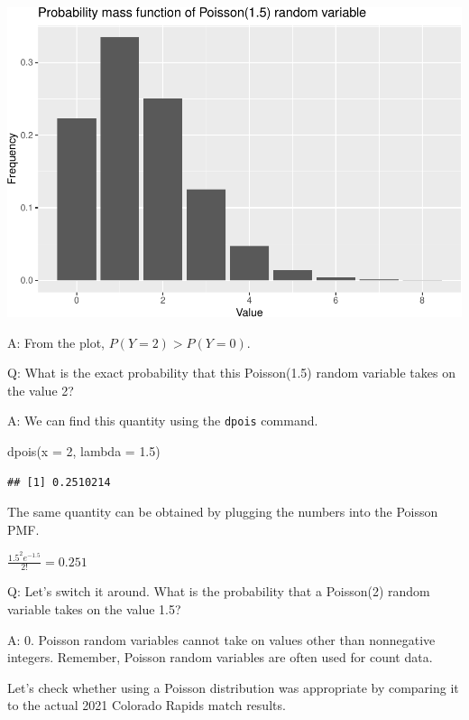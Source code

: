 \documentclass[
  11pt,
]{book}
\newenvironment{Shaded}{\begin{snugshade}}{\end{snugshade}}
\newcommand{\AttributeTok}[1]{\textcolor[rgb]{0.77,0.63,0.00}{#1}}
\newcommand{\DecValTok}[1]{\textcolor[rgb]{0.00,0.00,0.81}{#1}}
\newcommand{\FloatTok}[1]{\textcolor[rgb]{0.00,0.00,0.81}{#1}}
\newcommand{\FunctionTok}[1]{\textcolor[rgb]{0.00,0.00,0.00}{#1}}
\newcommand{\NormalTok}[1]{#1}
\theoremstyle{definition}
\theoremstyle{definition}
\theoremstyle{definition}
\theoremstyle{definition}
\theoremstyle{remark}
\begin{document}
\includegraphics{series_files/figure-latex/soccer poisson-1.pdf}

A: From the plot, \(P(Y = 2) > P(Y = 0)\).

Q: What is the exact probability that this Poisson(1.5) random variable takes on the value 2?

A: We can find this quantity using the \texttt{dpois} command.

\begin{Shaded}
\begin{Highlighting}[]
\FunctionTok{dpois}\NormalTok{(}\AttributeTok{x =} \DecValTok{2}\NormalTok{, }\AttributeTok{lambda =} \FloatTok{1.5}\NormalTok{)}
\end{Highlighting}
\end{Shaded}

\begin{verbatim}
## [1] 0.2510214
\end{verbatim}

The same quantity can be obtained by plugging the numbers into the Poisson PMF.

\(\frac{1.5^2 e^{-1.5}}{2!} = 0.251\)

Q: Let's switch it around. What is the probability that a Poisson(2) random variable takes on the value 1.5?

A: 0. Poisson random variables cannot take on values other than nonnegative integers. Remember, Poisson random variables are often used for count data.

Let's check whether using a Poisson distribution was appropriate by comparing it to the actual 2021 Colorado Rapids match results.
\end{document}
